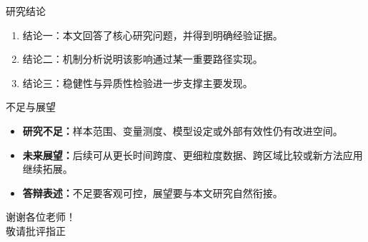 \documentclass{beamer}
\begin{document}
\begin{frame}{研究结论}
    \begin{enumerate}
        \item 结论一：本文回答了核心研究问题，并得到明确经验证据。
        \item 结论二：机制分析说明该影响通过某一重要路径实现。
        \item 结论三：稳健性与异质性检验进一步支撑主要发现。
    \end{enumerate}
\end{frame}

\begin{frame}{不足与展望}
    \begin{itemize}
        \item \textbf{研究不足：}样本范围、变量测度、模型设定或外部有效性仍有改进空间。
        \item \textbf{未来展望：}后续可从更长时间跨度、更细粒度数据、跨区域比较或新方法应用继续拓展。
        \item \textbf{答辩表述：}不足要客观可控，展望要与本文研究自然衔接。
    \end{itemize}
\end{frame}

\begin{frame}
    \begin{center}
        {\Huge 谢谢各位老师！}\\[0.5cm]
        {\Large 敬请批评指正}
    \end{center}
\end{frame}
\end{document}
